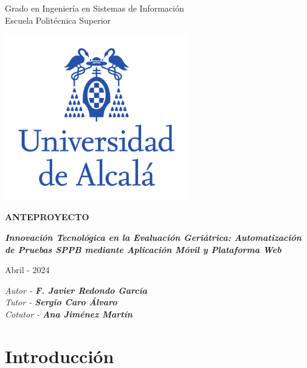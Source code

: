 \documentclass[12pt,oneside,a4paper]{article}
\begin{document}
\thispagestyle{empty}

\begin{center}

\begin{large}
Grado en Ingeniería en Sistemas de Información\\
Escuela Politécnica Superior\\
\end{large}
\vspace{1cm}

\includegraphics[width=8cm]{figuras/logo-uah.pdf}

\textbf{ANTEPROYECTO}

\vspace{1cm}

\begin{large}\textbf{\textit{Innovación Tecnológica en la Evaluación Geriátrica: Automatización de Pruebas SPPB mediante Aplicación Móvil y Plataforma Web}}\end{large}

\vfill

Abril - 2024

\end{center}

\begin{flushright}
\textit{Autor - \textbf{F. Javier Redondo García}} \\
\textit{Tutor - \textbf{Sergio Caro Álvaro}} \\
\textit{Cotutor - \textbf{Ana Jiménez Martín}}
\end{flushright}

\newpage

\section{Introducción}
\end{document}
